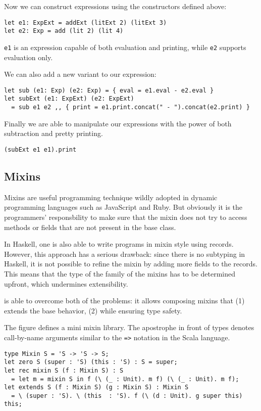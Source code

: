 Now we can construct expressions using the constructors defined above:
\begin{lstlisting}
let e1: ExpExt = addExt (litExt 2) (litExt 3)
let e2: Exp = add (lit 2) (lit 4)
\end{lstlisting}
\lstinline{e1} is an expression capable of both evaluation and printing, while
\lstinline{e2} supports evaluation only.

We can also add a new variant to our expression:
\begin{lstlisting}
let sub (e1: Exp) (e2: Exp) = { eval = e1.eval - e2.eval }
let subExt (e1: ExpExt) (e2: ExpExt)
  = sub e1 e2 ,, { print = e1.print.concat(" - ").concat(e2.print) }
\end{lstlisting}

Finally we are able to manipulate our expressions with the power of both
subtraction and pretty printing.
\begin{lstlisting}
(subExt e1 e1).print
\end{lstlisting}

\subsection{Mixins}

Mixins are useful programming technique wildly adopted in dynamic programming
languages such as JavaScript and Ruby. But obviously it is the programmers'
responsbility to make sure that the mixin does not try to access methods or
fields that are not present in the base class.

In Haskell, one is also able to write programs in mixin style using records.
However, this approach has a serious drawback: since there is no subtyping in
Haskell, it is not possible to refine the mixin by adding more fields to the
records. This means that the type of the family of the mixins has to be
determined upfront, which undermines extensibility.

\name is able to overcome both of the problems: it allows composing mixins
that (1) extends the base behavior, (2) while ensuring type safety.

The figure defines a mini mixin library. The apostrophe in front of types
denotes call-by-name arguments similar to the \lstinline{=>} notation in the
Scala language.

\begin{lstlisting}
type Mixin S = 'S -> 'S -> S;
let zero S (super : 'S) (this : 'S) : S = super;
let rec mixin S (f : Mixin S) : S
  = let m = mixin S in f (\ (_ : Unit). m f) (\ (_ : Unit). m f);
let extends S (f : Mixin S) (g : Mixin S) : Mixin S
  = \ (super : 'S). \ (this  : 'S). f (\ (d : Unit). g super this) this;
\end{lstlisting}


